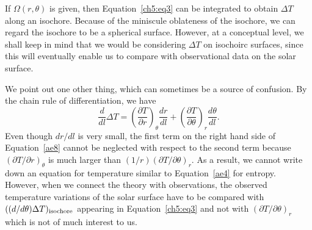% 


If $\Omega (r, \theta)$ is given, then
Equation~\ref{ch5:eq3} can be integrated to obtain
$\Delta T$ along an isochore.  Because of the miniscule oblateness of the isochore, we can regard the isochore
to be a spherical surface.  However, at a conceptual level, we shall keep in mind that we would be considering
$\Delta T$ on isochoirc surfaces, since this will eventually enable us to compare with observational data
on the solar surface.

We point out one other thing, which can sometimes be
a source of confusion. By the chain rule of 
differentiation, we have
\begin{equation}
\frac{d}{dl}\Delta T = \left( \frac{\partial T}{\partial r} \right)_{\theta} \frac{d r}{dl}
+ \left( \frac{\partial T}{\partial \theta} \right)_r \frac{d \theta}{dl}. 
\label{ae8}
\end{equation}
Even though $d r/ dl$ is very small, the first term on
the right hand side of Equation~\ref{ae8} cannot be
neglected with respect to the second term because $(\partial T/ \partial r)_{\theta}$ is much larger
than $(1/r)(\partial T / \partial \theta)_r$.  As a result, we cannot write down an equation for temperature
similar to Equation~\ref{ae4} for entropy. However, when
we connect the theory with observations, the observed
temperature variations of the solar surface have to be
compared with $((d/d \theta) \Delta T)_{\rm isochore}$
appearing in Equation~\ref{ch5:eq3} and not with $(\partial T / \partial \theta)_r$ which is not of much interest to us.
